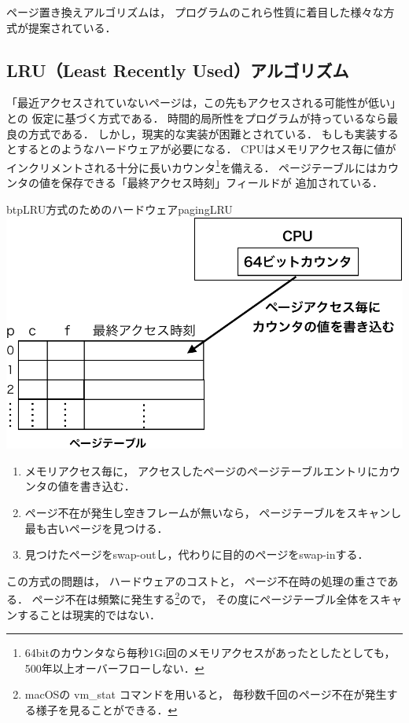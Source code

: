 ページ置き換えアルゴリズムは，
プログラムのこれら性質に着目した様々な方式が提案されている．

\subsection{LRU（Least Recently Used）アルゴリズム}
「最近アクセスされていないページは，この先もアクセスされる可能性が低い」との
仮定に基づく方式である．
時間的局所性をプログラムが持っているなら最良の方式である．
しかし，現実的な実装が困難とされている．
もしも実装するとするとのようなハードウェアが必要になる．
CPUはメモリアクセス毎に値がインクリメントされる十分に長いカウンタ\footnote{
64bitのカウンタなら毎秒1Gi回のメモリアクセスがあったとしたとしても，
500年以上オーバーフローしない．
}を備える．
ページテーブルにはカウンタの値を保存できる「最終アクセス時刻」フィールドが
追加されている．

\begin{myfig}{btp}{LRU方式のためのハードウェア}{pagingLRU}
  \includegraphics[scale=0.66]{Fig/pagingLRU-crop.pdf}
\end{myfig}

\begin{enumerate}
\item メモリアクセス毎に，
  アクセスしたページのページテーブルエントリにカウンタの値を書き込む．
\item ページ不在が発生し空きフレームが無いなら，
  ページテーブルをスキャンし最も古いページを見つける．
\item 見つけたページをswap-outし，代わりに目的のページをswap-inする．
\end{enumerate}

この方式の問題は，
ハードウェアのコストと，
ページ不在時の処理の重さである．
ページ不在は頻繁に発生する\footnote{
macOSの vm\_stat コマンドを用いると，
毎秒数千回のページ不在が発生する様子を見ることができる．}ので，
その度にページテーブル全体をスキャンすることは現実的ではない．

